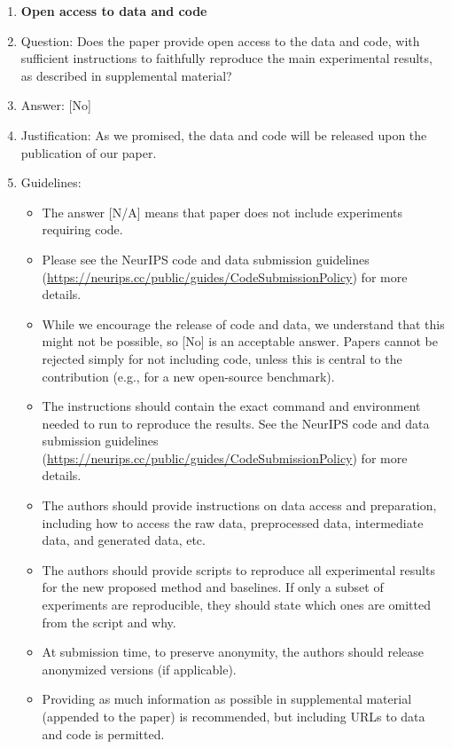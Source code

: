 \documentclass{llmxive}
\providecommand{\answerYes}[1][]{[Yes]#1}
\providecommand{\answerNo}[1][]{[No]#1}
\providecommand{\answerNA}[1][]{[N/A]#1}
\begin{document}
{\begin{enumerate}
\item {\bf Open access to data and code}
    \item[] Question: Does the paper provide open access to the data and code, with sufficient instructions to faithfully reproduce the main experimental results, as described in supplemental material?
    \item[] Answer: \answerNo{} %
    \item[] Justification: As we promised, the data and code will be released upon the publication of our paper.
    \item[] Guidelines:
    \begin{itemize}
        \item The answer \answerNA{} means that paper does not include experiments requiring code.
        \item Please see the NeurIPS code and data submission guidelines (\url{https://neurips.cc/public/guides/CodeSubmissionPolicy}) for more details.
        \item While we encourage the release of code and data, we understand that this might not be possible, so \answerNo{} is an acceptable answer. Papers cannot be rejected simply for not including code, unless this is central to the contribution (e.g., for a new open-source benchmark).
        \item The instructions should contain the exact command and environment needed to run to reproduce the results. See the NeurIPS code and data submission guidelines (\url{https://neurips.cc/public/guides/CodeSubmissionPolicy}) for more details.
        \item The authors should provide instructions on data access and preparation, including how to access the raw data, preprocessed data, intermediate data, and generated data, etc.
        \item The authors should provide scripts to reproduce all experimental results for the new proposed method and baselines. If only a subset of experiments are reproducible, they should state which ones are omitted from the script and why.
        \item At submission time, to preserve anonymity, the authors should release anonymized versions (if applicable).
        \item Providing as much information as possible in supplemental material (appended to the paper) is recommended, but including URLs to data and code is permitted.
    \end{itemize}



\end{enumerate}}
\end{document}
